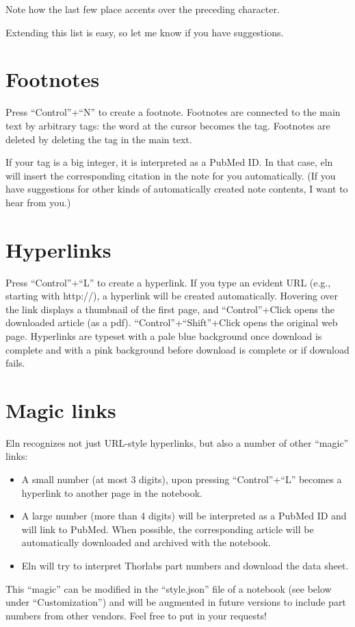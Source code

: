 \documentclass[11pt]{report}
\begin{document}
\noindent Note how the last few place accents over the preceding character.

Extending this list is easy, so let me know if you have suggestions.

\section{Footnotes}

Press ``Control''+``N'' to create a footnote. Footnotes are connected
to the main text by arbitrary tags: the word at the cursor
becomes the tag. Footnotes are deleted by deleting the tag in the main
text.

If your tag is a big integer, it is interpreted as a PubMed ID. In
that case, eln will insert the corresponding citation in the note for
you automatically. (If you have suggestions for other kinds of
automatically created note contents, I want to hear from you.)

\section{Hyperlinks}

Press ``Control''+``L'' to create a hyperlink. If you
type an evident URL (e.g., starting with http://), a hyperlink will be
created automatically. Hovering over the link displays a
thumbnail of the first page, and ``Control''+Click opens the
downloaded article (as a pdf). ``Control''+``Shift''+Click opens the
original web page. Hyperlinks are typeset with a pale blue background
once download is complete and with a pink background before download
is complete or if download fails.

\section{Magic links}

Eln recognizes not just URL-style hyperlinks, but also a number of
other ``magic'' links:
\begin{itemize}
\item A small number (at most 3 digits), upon pressing ``Control''+``L''
becomes a hyperlink to another page in the notebook.
\item A large number (more than 4 digits)
will be interpreted as a PubMed ID and will link to PubMed. When
possible, the corresponding article will be automatically downloaded
and archived with the notebook. 
\item Eln will try to interpret Thorlabs part numbers and
  download the data sheet.
\end{itemize}
This ``magic'' can be modified in the ``style.json'' file of a
notebook (see below under ``Customization'') and will be augmented in
future versions to include part numbers from other vendors. Feel free
to put in your requests!
\end{document}
